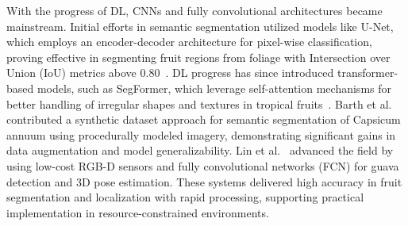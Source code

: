\documentclass[a4paper,fleqn]{cas-dc}
\begin{document}
With the progress of DL, CNNs and fully convolutional architectures became mainstream. Initial efforts in semantic segmentation utilized models like U-Net, which employs an encoder-decoder architecture for pixel-wise classification, proving effective in segmenting fruit regions from foliage with Intersection over Union (IoU) metrics above 0.80~\cite{ronneberger2015u}. DL progress has since introduced transformer-based models, such as SegFormer, which leverage self-attention mechanisms for better handling of irregular shapes and textures in tropical fruits~\cite{xie2021segformer}. 
Barth et al.~\cite{barth2018data} contributed a synthetic dataset approach for semantic segmentation of Capsicum annuum using procedurally modeled imagery, demonstrating significant gains in data augmentation and model generalizability.
Lin et al.~\cite{lin2020color} advanced the field by using low-cost RGB-D sensors and fully convolutional networks (FCN) for guava detection and 3D pose estimation. These systems delivered high accuracy in fruit segmentation and localization with rapid processing, supporting practical implementation in resource-constrained environments.
\end{document}
